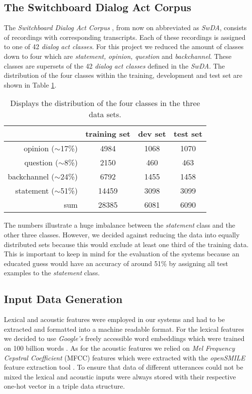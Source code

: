 \documentclass[11pt,a4paper]{article}
\begin{document}
	\subsection{The Switchboard Dialog Act Corpus}
	The \textit{Switchboard Dialog Act Corpus} \cite{switchboard}, from now on abbreviated as \textit{SwDA}, consists of recordings with corresponding transcripts. Each of these recordings is assigned to one of 42 \textit{dialog act classes}. For this project we reduced the amount of classes down to four which are \textit{statement, opinion, question} and \textit{backchannel}. These classes are supersets of the 42 \textit{dialog act classes} defined in the \textit{SwDA}. The distribution of the four classes within the training, development and test set are shown in Table \ref{tab:dataDistribution}.
	\begin{table}[]
		\begin{tabular}{ r | c c c }
			& training set & dev set & test set \\
			\hline
			opinion ($\sim$17\%) & 4984 & 1068 & 1070 \\
			question ($\sim$8\%) & 2150 & 460 & 463 \\
			backchannel ($\sim$24\%) & 6792 & 1455 & 1458  \\
			statement ($\sim$51\%) & 14459 & 3098 &  3099  \\
			\hline
			sum & 28385 & 6081 & 6090 \\
		\end{tabular}
		\caption{Displays the distribution of the four classes in the three data sets.}
		\label{tab:dataDistribution}
	\end{table}	
	The numbers illustrate a huge imbalance between the \textit{statement} class and the other three classes. However, we decided against reducing the data into equally distributed sets because this would exclude at least one third of the training data. This is important to keep in mind for the evaluation of the systems because an educated guess would have an accuracy of around 51\% by assigning all test examples to the \textit{statement} class.

	\subsection{Input Data Generation}
	Lexical and acoustic features were employed in our systems and had to be extracted and formatted into a machine readable format. For the lexical features we decided to use \textit{Google's} freely accessible word embeddings which were trained on 100 billion words \cite{word2vec}. As for the acoustic features we relied on \textit{Mel Frequency Cepstral Coefficient} (MFCC) features which were extracted with the \textit{openSMILE} feature extraction tool \cite{opensmile}. To ensure that data of different utterances could not be mixed the lexical and acoustic inputs were always stored with their respective one-hot vector in a triple data structure.
	
\end{document}
